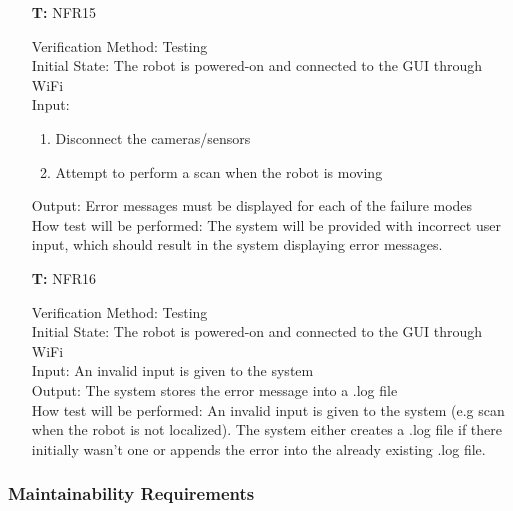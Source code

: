\documentclass[12pt, titlepage]{article}
\newcounter{tnum} %
\begin{document}
\begin{itemize}

\item[\textbf{T\refstepcounter{tnum}\thetnum:}]{NFR15\\}

Verification Method: Testing\\					
Initial State: 	The robot is powered-on and connected to the GUI through WiFi	\\
Input: \begin{enumerate}
	\item Disconnect the cameras/sensors
	\item Attempt to perform a scan when the robot is moving
	\end{enumerate}
Output: Error messages must be displayed for each of the failure modes\\
How test will be performed: The system will be provided with incorrect user input, which should result in the system displaying error messages.\\

\item[\textbf{T\refstepcounter{tnum}\thetnum:}]{NFR16\\}

Verification Method: Testing\\					
Initial State: The robot is powered-on and connected to the GUI through WiFi	\\
Input: An invalid input is given to the system\\
Output: The system stores the error message into a .log file\\
How test will be performed: An invalid input is given to the system (e.g scan when the robot is not localized). The system either creates a .log file if there initially wasn't one or appends the error into the already existing .log file.\\
\end{itemize}

\subsubsection{Maintainability Requirements}
\end{document}
